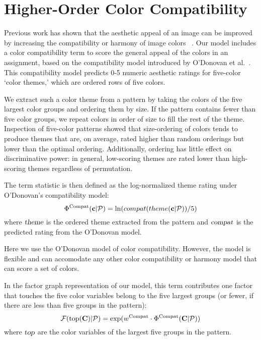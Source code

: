 \section{Higher-Order Color Compatibility}
\label{sec:colorCompat}

 Previous work has shown that the aesthetic appeal of an image can be improved by increasing the compatibility or harmony of image colors ~\cite{CohenOrHarmonization,DressUp,ColorizationUsingHarmony,ODonovan}. Our model includes a color compatibility term to score the general appeal of the colors in an assignment, based on the compatibility model introduced by O'Donovan et al.~. This compatibility model predicts 0-5 numeric aesthetic ratings for five-color `color themes,' which are ordered rows of five colors. 

We extract such a color theme from a pattern by taking the colors of the five largest color groups and ordering them by size. If the pattern contains fewer than five color groups, we repeat colors in order of size to fill the rest of the theme. Inspection of five-color patterns showed that size-ordering of colors tends to produce themes that are, on average, rated higher than random orderings but lower than the optimal ordering. Additionally, ordering has little effect on discriminative power: in general, low-scoring themes are rated lower than high-scoring themes regardless of permutation.


The term statistic is then defined as the log-normalized theme rating under O'Donovan's compatibility model:
\begin{equation*}
\Phi^{\textrm{Compat}}(\mathbf{c}| \mathcal{P}) = \ln(compat(theme(\mathbf{c}| \mathcal{P}))/5)
\end{equation*}
where $\textsl{theme}$ is the ordered theme extracted from the pattern and $\textsl{compat}$ is the predicted rating from the O'Donovan model.

Here we use the O'Donovan model of color compatibility. However, the model is flexible and can accomodate any other color compatibility or harmony model that can score a set of colors.

In the factor graph representation of our model, this term contributes one factor that touches the five color variables belong to the five largest groups (or fewer, if there are less than five groups in the pattern):
\begin{equation*}
\mathcal{F}(\textrm{top}(\mathbf{C}) | \mathcal{P}) = \exp(w^{\textrm{Compat}} \cdot \Phi^{\textrm{Compat}}(\mathbf{C} | \mathcal{P}))
\end{equation*}
where $\textsl{top}$ are the color variables of the largest five groups in the pattern.